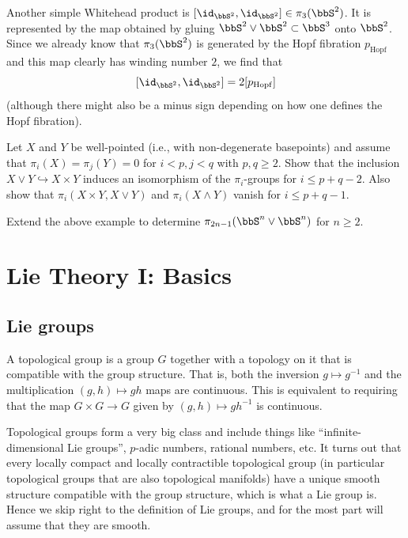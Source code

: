 \begin{example}
    Another simple Whitehead product is $[\id_{\bbS^2},\id_{\bbS^2}]\in\pi_3(\bbS^2)$. It is represented by the map obtained by gluing $\bbS^2\vee \bbS^2\subset \bbS^3$ onto $\bbS^2$. Since we already know that $\pi_3(\bbS^2)$ is generated by the Hopf fibration $p_{\mathrm{Hopf}}$ and this map clearly has winding number $2$, we find that 
    \[[\id_{\bbS^2},\id_{\bbS^2}]=2[p_{\mathrm{Hopf}}]\]
    (although there might also be a minus sign depending on how one defines the Hopf fibration).
\end{example}

\begin{xca}
    Let $X$ and $Y$ be well-pointed (i.e., with non-degenerate basepoints) and assume that $\pi_i(X)=\pi_j(Y)=0$ for $i<p,j<q$ with $p,q\geq 2$. Show that the inclusion $X\vee Y\hookrightarrow X\times Y$ induces an isomorphism of the $\pi_i$-groups for $i\leq p+q-2$. Also show that $\pi_i(X\times Y,X\vee Y)$ and $\pi_i(X\wedge Y)$ vanish for $i\leq p+q-1$.
\end{xca}

\begin{xca}
    Extend the above example to determine $\pi_{2n-1}(\bbS^n\vee \bbS^n)$ for $n\geq 2$.
\end{xca}


\clearpage 

\chapter{Lie Theory I: Basics}\label{ch Lie I}

\section{Lie groups}

\begin{defn}
    A topological group is a group $G$ together with a topology on it that is compatible with the group structure. That is, both the inversion $g\mapsto g^{-1}$ and the multiplication $(g,h)\mapsto gh$ maps are continuous. This is equivalent to requiring that the map $G\times G\to G$ given by $(g,h)\mapsto gh^{-1}$ is continuous.
\end{defn}

Topological groups form a very big class and include things like ``infinite-dimensional Lie groups'', $p$-adic numbers, rational numbers, etc. It turns out that every locally compact and locally contractible topological group (in particular topological groups that are also topological manifolds) have a unique smooth structure compatible with the group structure, which is what a Lie group is. Hence we skip right to the definition of Lie groups, and for the most part will assume that they are smooth.

